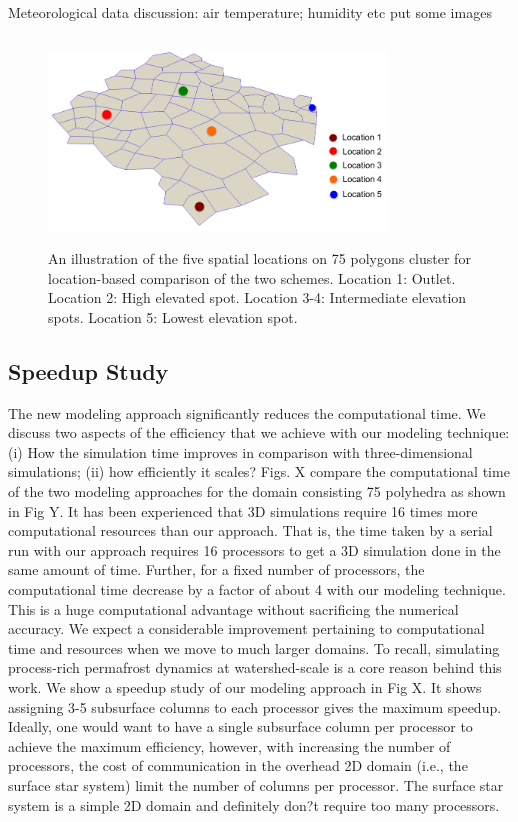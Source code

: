 \documentclass[review]{elsarticle}
\begin{document}
Meteorological data discussion: air temperature; humidity etc put some images

 \begin{figure}[!htpb]
\centering
\includegraphics[height = 5.5cm, width=9cm]{figures/surface-locations.png}
\caption{An illustration of the five spatial locations on 75 polygons cluster for location-based comparison of the two schemes. Location 1: Outlet. Location 2: High elevated spot. Location 3-4: Intermediate elevation spots. Location 5: Lowest elevation spot.}
\label{surf-location}
\end{figure}

\subsection{Speedup Study}
The new modeling approach significantly reduces the computational time. We discuss two aspects of the efficiency that we achieve with our modeling technique: (i) How the simulation time improves in comparison with three-dimensional simulations; (ii) how efficiently it scales? Figs. X compare the computational time of the two modeling approaches for the domain consisting 75 polyhedra as shown in Fig Y. It has been experienced that 3D simulations require 16 times more computational resources than our approach. That is, the time taken by a serial run with our approach requires 16 processors to get a 3D simulation done in the same amount of time. Further, for a fixed number of processors, the computational time decrease by a factor of about 4 with our modeling technique. This is a huge computational advantage without sacrificing the numerical accuracy. We expect a considerable improvement pertaining to computational time and resources when we move to much larger domains. To recall, simulating process-rich permafrost dynamics at watershed-scale is a core reason behind this work. We show a speedup study of our modeling approach in Fig X. It shows assigning 3-5 subsurface columns to each processor gives the maximum speedup. Ideally, one would want to have a single subsurface column per processor to achieve the maximum efficiency, however, with increasing the number of processors, the cost of communication in the overhead 2D domain (i.e., the surface star system) limit the number of columns per processor. The surface star system is a simple 2D domain and definitely don?t require too many processors. 
\end{document}
